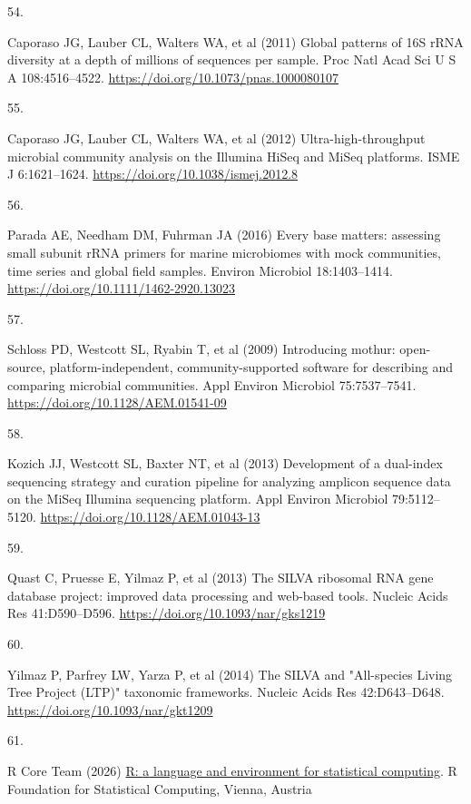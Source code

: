 \documentclass[
  12 pt,
]{article}
\newlength{\cslhangindent}
\newlength{\csllabelwidth}
\newenvironment{CSLReferences}[2] %
 {\begin{list}{}{%
  \setlength{\itemindent}{0pt}
  \setlength{\leftmargin}{0pt}
  \setlength{\parsep}{0pt}
  \ifodd #1
   \setlength{\leftmargin}{\cslhangindent}
   \setlength{\itemindent}{-1\cslhangindent}
  \fi
  \setlength{\itemsep}{#2\baselineskip}}}
 {\end{list}}
\newcommand{\CSLLeftMargin}[1]{\parbox[t]{\csllabelwidth}{\strut#1\strut}}
\newcommand{\CSLRightInline}[1]{\parbox[t]{\linewidth - \csllabelwidth}{\strut#1\strut}}
\begin{document}
\begin{CSLReferences}{0}{0}
\CSLLeftMargin{54. }%
\CSLRightInline{Caporaso JG, Lauber CL, Walters WA, et al (2011) Global patterns of {16S rRNA} diversity at a depth of millions of sequences per sample. Proc Natl Acad Sci U S A 108:4516--4522. \url{https://doi.org/10.1073/pnas.1000080107}}

\CSLLeftMargin{55. }%
\CSLRightInline{Caporaso JG, Lauber CL, Walters WA, et al (2012) Ultra-high-throughput microbial community analysis on the {Illumina HiSeq} and {MiSeq} platforms. ISME J 6:1621--1624. \url{https://doi.org/10.1038/ismej.2012.8}}

\CSLLeftMargin{56. }%
\CSLRightInline{Parada AE, Needham DM, Fuhrman JA (2016) Every base matters: assessing small subunit {rRNA} primers for marine microbiomes with mock communities, time series and global field samples. Environ Microbiol 18:1403--1414. \url{https://doi.org/10.1111/1462-2920.13023}}

\CSLLeftMargin{57. }%
\CSLRightInline{Schloss PD, Westcott SL, Ryabin T, et al (2009) Introducing mothur: open-source, platform-independent, community-supported software for describing and comparing microbial communities. Appl Environ Microbiol 75:7537--7541. \url{https://doi.org/10.1128/AEM.01541-09}}

\CSLLeftMargin{58. }%
\CSLRightInline{Kozich JJ, Westcott SL, Baxter NT, et al (2013) Development of a dual-index sequencing strategy and curation pipeline for analyzing amplicon sequence data on the {MiSeq Illumina} sequencing platform. Appl Environ Microbiol 79:5112--5120. \url{https://doi.org/10.1128/AEM.01043-13}}

\CSLLeftMargin{59. }%
\CSLRightInline{Quast C, Pruesse E, Yilmaz P, et al (2013) The {SILVA} ribosomal {RNA} gene database project: improved data processing and web-based tools. Nucleic Acids Res 41:D590--D596. \url{https://doi.org/10.1093/nar/gks1219}}

\CSLLeftMargin{60. }%
\CSLRightInline{Yilmaz P, Parfrey LW, Yarza P, et al (2014) The {SILVA} and "{All-species Living Tree Project} ({LTP})" taxonomic frameworks. Nucleic Acids Res 42:D643--D648. \url{https://doi.org/10.1093/nar/gkt1209}}

\CSLLeftMargin{61. }%
\CSLRightInline{R Core Team (2026) \href{https://doi.org/10.32614/R.manuals}{R: {a} language and environment for statistical computing}. R Foundation for Statistical Computing, Vienna, Austria}


\end{CSLReferences}
\end{document}
